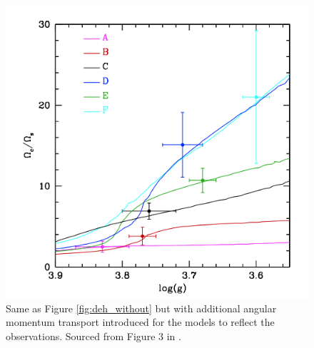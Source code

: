 \begin{figure}[h]
    \includegraphics[width=\textwidth]{Figures/intro_figures/deheuvels_disparity_with.png}
    \caption[A comparison of modelled and observed core to surface rotation rate ratios of post-main-sequence stars with additional angular momentum transport.]{Same as Figure \ref{fig:deh_without} but with additional angular momentum transport introduced for the models to reflect the observations.
    Sourced from Figure 3 in \citet{eggenberger_asteroseismology_2019}.}
    \label{fig:deh_with}
\end{figure}


